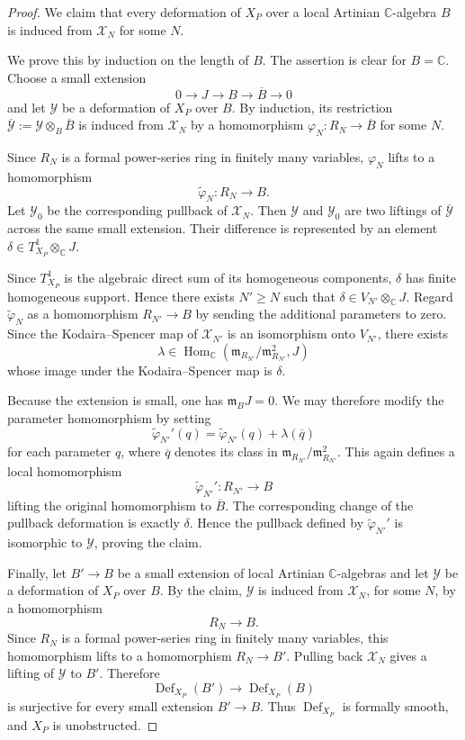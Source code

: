\documentclass[11pt]{amsart}
\numberwithin{equation}{section}
\theoremstyle{plain}
\theoremstyle{definition}
\newcommand{\0}{$0$-mutable}
\newcommand{\CC}{\ensuremath{\mathbb{C}}}
\renewcommand{\1}{$1$-rigid}
\renewcommand{\0}{$0$-mutable}
\newcommand{\Def}{\operatorname{Def}}
\begin{document}
\begin{proof}
We claim that every deformation of \(X_P\) over a local Artinian
\(\CC\)-algebra \(B\) is induced from \(\mathcal X_N\) for some
\(N\).

We prove this by induction on the length of \(B\). The assertion is
clear for \(B=\CC\). Choose a small extension
\[
0\longrightarrow J
\longrightarrow B
\longrightarrow\overline B
\longrightarrow0
\]
and let \(\mathcal Y\) be a deformation of \(X_P\) over \(B\).
By induction, its restriction
$
\overline{\mathcal Y}
:=
\mathcal Y\otimes_B\overline B
$
is induced from \(\mathcal X_N\) by a homomorphism
$
\varphi_N\colon R_N\longrightarrow\overline B
$
for some \(N\).

Since \(R_N\) is a formal power-series ring in finitely many
variables, \(\varphi_N\) lifts to a homomorphism
\[
\widetilde\varphi_N\colon R_N\longrightarrow B.
\]
Let \(\mathcal Y_0\) be the corresponding pullback of
\(\mathcal X_N\). Then \(\mathcal Y\) and \(\mathcal Y_0\) are two
liftings of \(\overline{\mathcal Y}\) across the same small extension.
Their difference is represented by an element
$
\delta\in T^1_{X_P}\otimes_{\CC}J.
$

Since \(T^1_{X_P}\) is the algebraic direct sum of its homogeneous
components, \(\delta\) has finite homogeneous support. Hence there
exists \(N'\geq N\) such that
$
\delta\in V_{N'}\otimes_{\CC}J.
$
Regard \(\widetilde\varphi_N\) as a homomorphism
$
R_{N'}\longrightarrow B
$
by sending the additional parameters to zero. Since the
Kodaira--Spencer map of \(\mathcal X_{N'}\) is an isomorphism onto
\(V_{N'}\), there exists
\[
\lambda\in
\operatorname{Hom}_{\CC}
\left(
\mathfrak m_{R_{N'}}/
\mathfrak m_{R_{N'}}^2,
J
\right)
\]
whose image under the Kodaira--Spencer map is \(\delta\).

Because the extension is small, one has
$
\mathfrak m_BJ=0.
$
We may therefore modify the parameter homomorphism by setting
\[
\widetilde\varphi_{N'}'(q)
=
\widetilde\varphi_{N'}(q)+\lambda(\overline q)
\]
for each parameter \(q\), where \(\overline q\) denotes its class in
\(\mathfrak m_{R_{N'}}/\mathfrak m_{R_{N'}}^2\). This again defines a
local homomorphism
\[
\widetilde\varphi_{N'}'
\colon
R_{N'}\longrightarrow B
\]
lifting the original homomorphism to \(\overline B\). The corresponding
change of the pullback deformation is exactly \(\delta\). Hence the
pullback defined by \(\widetilde\varphi_{N'}'\) is isomorphic to
\(\mathcal Y\), proving the claim.

Finally, let
$
B'\longrightarrow B
$
be a small extension of local Artinian \(\CC\)-algebras and let
\(\mathcal Y\) be a deformation of \(X_P\) over \(B\). By the claim,
\(\mathcal Y\) is induced from \(\mathcal X_N\), for some \(N\), by a
homomorphism
$$
R_N\longrightarrow B.
$$
Since \(R_N\) is a formal power-series ring in finitely many variables,
this homomorphism lifts to a homomorphism
$
R_N\longrightarrow B'.
$
Pulling back \(\mathcal X_N\) gives a lifting of \(\mathcal Y\) to
\(B'\). Therefore
\[
\Def_{X_P}(B')
\longrightarrow
\Def_{X_P}(B)
\]
is surjective for every small extension \(B'\to B\). Thus
\(\Def_{X_P}\) is formally smooth, and \(X_P\) is unobstructed.
\end{proof}
\end{document}
